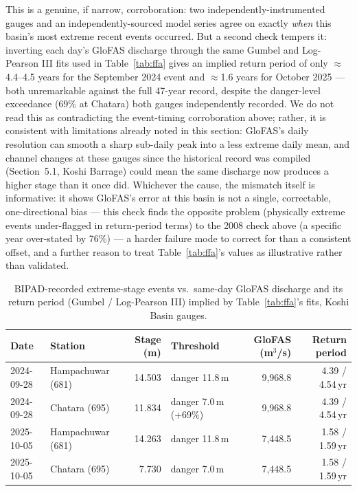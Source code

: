 \documentclass[11pt]{article}
\begin{document}
This is a genuine, if narrow, corroboration: two independently-instrumented gauges and an independently-sourced model series agree on exactly \emph{when} this basin's most extreme recent events occurred. But a second check tempers it: inverting each day's GloFAS discharge through the same Gumbel and Log-Pearson III fits used in Table~\ref{tab:ffa} gives an implied return period of only ${\approx}$4.4--4.5 years for the September 2024 event and ${\approx}$1.6 years for October 2025 --- both unremarkable against the full 47-year record, despite the danger-level exceedance (69\% at Chatara) both gauges independently recorded. We do not read this as contradicting the event-timing corroboration above; rather, it is consistent with limitations already noted in this section: GloFAS's daily resolution can smooth a sharp sub-daily peak into a less extreme daily mean, and channel changes at these gauges since the historical record was compiled (Section~5.1, Koshi Barrage) could mean the same discharge now produces a higher stage than it once did. Whichever the cause, the mismatch itself is informative: it shows GloFAS's error at this basin is not a single, correctable, one-directional bias --- this check finds the opposite problem (physically extreme events under-flagged in return-period terms) to the 2008 check above (a specific year over-stated by 76\%) --- a harder failure mode to correct for than a consistent offset, and a further reason to treat Table~\ref{tab:ffa}'s values as illustrative rather than validated.

\begin{table}[h]
\centering
\small
\begin{tabular}{@{}llrlrr@{}}
\toprule
Date & Station & Stage (m) & Threshold & GloFAS (m$^3$/s) & Return period \\
\midrule
2024-09-28 & Hampachuwar (681) & 14.503 & danger 11.8\,m & 9,968.8 & 4.39 / 4.54\,yr \\
2024-09-28 & Chatara (695) & 11.834 & danger 7.0\,m (+69\%) & 9,968.8 & 4.39 / 4.54\,yr \\
2025-10-05 & Hampachuwar (681) & 14.263 & danger 11.8\,m & 7,448.5 & 1.58 / 1.59\,yr \\
2025-10-05 & Chatara (695) & 7.730 & danger 7.0\,m & 7,448.5 & 1.58 / 1.59\,yr \\
\bottomrule
\end{tabular}
\caption{BIPAD-recorded extreme-stage events vs.\ same-day GloFAS discharge and its return period (Gumbel / Log-Pearson III) implied by Table~\ref{tab:ffa}'s fits, Koshi Basin gauges.}
\label{tab:bipad}
\end{table}
\end{document}
